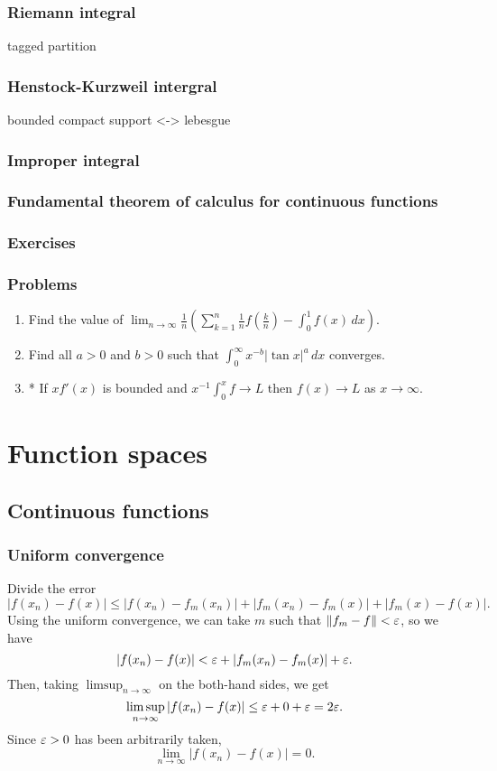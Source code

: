 \documentclass{../../large}
\begin{document}
\section{Riemann integral}
tagged partition
\section{Henstock-Kurzweil intergral}
bounded compact support <-> lebesgue
\section{Improper integral}
\section{Fundamental theorem of calculus for continuous functions}

\section*{Exercises}

\section*{Problems}
\begin{enumerate}
\item Find the value of $\lim_{n\to\infty}\frac1n\left(\sum_{k=1}^n\frac1nf\left(\frac kn\right)-\int_0^1f(x)\,dx\right)$.
\item Find all $a>0$ and $b>0$ such that $\int_0^\infty x^{-b}|\tan x|^a\,dx$ converges.
\item* If $xf'(x)$ is bounded and $x^{-1}\int_0^xf\to L$ then $f(x)\to L$ as $x\to\infty$.
\end{enumerate}









\part{Function spaces}

\chapter{Continuous functions}
\section{Uniform convergence}
\begin{pf}
Divide the error
\[|f(x_n)-f(x)|\le|f(x_n)-f_m(x_n)|+|f_m(x_n)-f_m(x)|+|f_m(x)-f(x)|.\]
Using the uniform convergence, we can take $m$ such that $\|f_m-f\|<\varepsilon$, so we have
\[|f(x_n)-f(x)|<\varepsilon+|f_m(x_n)-f_m(x)|+\varepsilon.\]
Then, taking $\limsup_{n\to\infty}$ on the both-hand sides, we get
\[\limsup_{n\to\infty}|f(x_n)-f(x)|\le\varepsilon+0+\varepsilon=2\varepsilon.\]
Since $\varepsilon>0$ has been arbitrarily taken,
\[\lim_{n\to\infty}|f(x_n)-f(x)|=0.\]
\end{pf}
\end{document}
